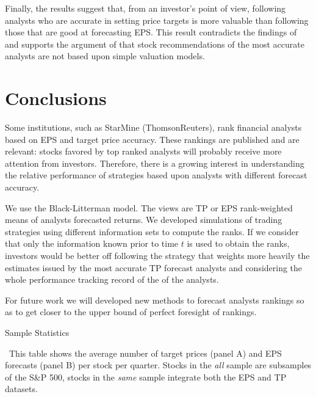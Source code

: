 \documentclass{article}\usepackage[]{graphicx}\usepackage[]{color}
\newcommand{\same}{\textit{same}}
\newcommand{\all}{\textit{all}}
\begin{document}
{Finally, the results suggest that, from an investor's point of view, following analysts who are accurate in setting price targets is more valuable than following those that are good at forecasting EPS.  This result contradicts the findings of \cite{bradshaw2004} and supports the argument of \cite{simon2011} that stock recommendations of the most accurate analysts are not based upon simple valuation models.

\section{Conclusions}
\label{sec:conclusion}

Some institutions, such as StarMine (ThomsonReuters), rank financial analysts based on EPS and target price accuracy. These rankings are published and are relevant: stocks favored by top ranked analysts will probably receive more attention from investors. Therefore, there is a growing interest in understanding the relative performance of strategies based upon analysts with different forecast accuracy.

We use the Black-Litterman model. The views are TP or EPS rank-weighted means of analysts forecasted returns. We developed simulations of trading strategies using different information sets to compute the ranks. If we consider that only the information known prior to time $t$ is used to obtain the ranks, investors would be better off following the strategy that weights more heavily the estimates issued  by the most accurate TP forecast analysts and considering the whole performance tracking record of the of the analysts.


For future work we will developed new methods to forecast analysts rankings so as to get closer to the upper bound of perfect foresight of rankings.


%





\newpage
\begin{table}[hp]
  \caption{Sample Statistics}
  \label{tab:ret-stat}
\ This table shows the average number of target prices  (panel A) and EPS forecasts (panel B) per stock per quarter. Stocks in the \all{} sample are subsamples of the S\&P 500, stocks in the \same{} sample integrate both the EPS and TP datasets.


\end{table}}
\end{document}
